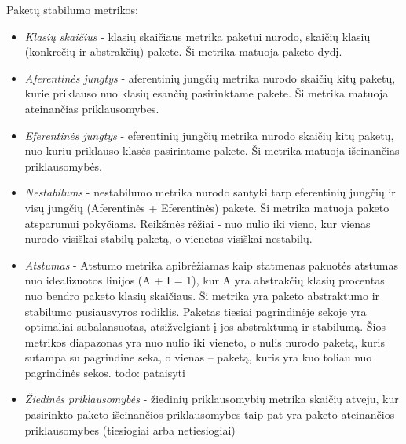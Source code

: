 Paketų stabilumo metrikos:
\begin{itemize}
    \item \textit{Klasių skaičius} - klasių skaičiaus metrika paketui nurodo, skaičių klasių (konkrečių ir abstrakčių) pakete.
    Ši metrika matuoja paketo dydį.
    \item \textit{Aferentinės jungtys } - aferentinių jungčių metrika nurodo
    skaičių kitų paketų, kurie priklauso nuo klasių esančių pasirinktame pakete.
    Ši metrika matuoja ateinančias priklausomybes.
    \item \textit{Eferentinės jungtys } - eferentinių jungčių metrika nurodo skaičių kitų paketų,
    nuo kuriu priklauso klasės pasirintame pakete.
    Ši metrika matuoja išeinančias priklausomybės.
    \item \textit{Nestabilums} - nestabilumo metrika nurodo santyki tarp eferentinių jungčių ir
    visų jungčių (Aferentinės + Eferentinės) pakete.
    Ši metrika matuoja paketo atsparumui pokyčiams.
    Reikšmės rėžiai - nuo nulio iki vieno, kur vienas nurodo visiškai stabilų paketą, o vienetas visiškai nestabilų.
    \item \textit{Atstumas} - Atstumo metrika apibrėžiamas kaip statmenas pakuotės atstumas nuo idealizuotos linijos (A + I = 1),
    kur A yra abstrakčių klasių procentas nuo bendro paketo klasių skaičiaus.
    Ši metrika yra paketo abstraktumo ir stabilumo pusiausvyros rodiklis.
    Paketas tiesiai pagrindinėje sekoje yra optimaliai subalansuotas, atsižvelgiant į jos abstraktumą ir stabilumą.
    Šios metrikos diapazonas yra nuo nulio iki vieneto, o nulis nurodo paketą, kuris sutampa su pagrindine seka,
    o vienas – paketą, kuris yra kuo toliau nuo pagrindinės sekos. todo: pataisyti
    \item \textit{Žiedinės priklausomybės} - žiedinių priklausomybių metrika skaičių atveju, kur pasirinkto paketo išeinančios priklausomybes taip pat
    yra paketo ateinančios priklausomybes (tiesiogiai arba netiesiogiai)
\end{itemize}